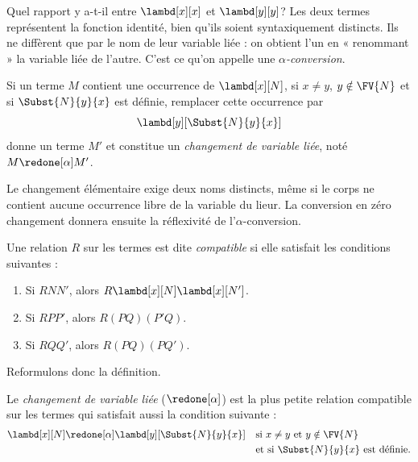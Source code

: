 \documentclass[../../../include/open-logic-section]{subfiles}
\begin{document}

Quel rapport y a-t-il entre $\lambd[x][x]$
et $\lambd[y][y]$? Les deux termes représentent
la fonction identité, bien qu'ils soient
syntaxiquement distincts. Ils ne diffèrent
que par le nom de leur variable liée : on
obtient l'un en « renommant » la variable liée
de l'autre. C'est ce qu'on appelle une
\emph{$\alpha$-conversion}.

\begin{defn}
Si un terme $M$ contient une occurrence de
$\lambd[x][N]$, si $x\neq y$,
$y \notin \FV{N}$ et si $\Subst{N}{y}{x}$
est définie, remplacer cette occurrence par
\begin{equation*}
  \lambd[y][\Subst{N}{y}{x}]
\end{equation*}
donne un terme $M'$ et constitue un
\emph{changement de variable liée}, noté
$M \redone[\alpha] M'$.
\end{defn}

\begin{explain}
Le changement élémentaire exige deux noms distincts, même si
le corps ne contient aucune occurrence libre de la variable
du lieur. La conversion en zéro changement donnera ensuite
la réflexivité de l'$\alpha$-conversion.
\end{explain}

\begin{defn}
Une relation $R$ sur les termes est dite
\emph{compatible} si elle satisfait les
conditions suivantes :
\begin{enumerate}
\item Si $R N N'$, alors
  $R \lambd[x][N] \lambd[x][N']$.
\item Si $R P P'$, alors $R (PQ) (P'Q)$.
\item Si $R Q Q'$, alors $R (PQ) (PQ')$.
\end{enumerate}
\end{defn}

Reformulons donc la définition.
\begin{defn}
Le \emph{changement de variable liée}
($\redone[\alpha]$) est la plus petite
relation compatible sur les termes qui
satisfait aussi la condition suivante :
\begin{align*}
  &\lambd[x][N] \redone[\alpha]
   \lambd[y][\Subst{N}{y}{x}]
   && \text{si $x \neq y$ et $y \notin \FV{N}$}\\
  & && \text{et si $\Subst{N}{y}{x}$ est définie.}
\end{align*}
\end{defn}
\end{document}
